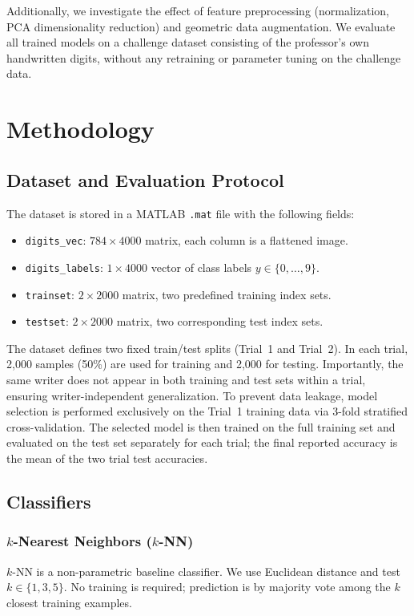 \documentclass[11pt,a4paper,twocolumn]{article}
\begin{document}
Additionally, we investigate the effect of feature preprocessing (normalization, PCA dimensionality reduction) and geometric data augmentation. We evaluate all trained models on a challenge dataset consisting of the professor's own handwritten digits, without any retraining or parameter tuning on the challenge data.

\section{Methodology}

\subsection{Dataset and Evaluation Protocol}

The dataset is stored in a MATLAB \texttt{.mat} file with the following fields:
\begin{itemize}[noitemsep]
    \item \texttt{digits\_vec}: $784 \times 4000$ matrix, each column is a flattened image.
    \item \texttt{digits\_labels}: $1 \times 4000$ vector of class labels $y \in \{0, \dots, 9\}$.
    \item \texttt{trainset}: $2 \times 2000$ matrix, two predefined training index sets.
    \item \texttt{testset}: $2 \times 2000$ matrix, two corresponding test index sets.
\end{itemize}

The dataset defines two fixed train/test splits (Trial~1 and Trial~2). In each trial, 2,000 samples (50\%) are used for training and 2,000 for testing. Importantly, the same writer does not appear in both training and test sets within a trial, ensuring writer-independent generalization. To prevent data leakage, model selection is performed exclusively on the Trial~1 training data via 3-fold stratified cross-validation. The selected model is then trained on the full training set and evaluated on the test set separately for each trial; the final reported accuracy is the mean of the two trial test accuracies.

\subsection{Classifiers}

\subsubsection{$k$-Nearest Neighbors ($k$-NN)}
$k$-NN is a non-parametric baseline classifier. We use Euclidean distance and test $k \in \{1, 3, 5\}$. No training is required; prediction is by majority vote among the $k$ closest training examples.
\end{document}
